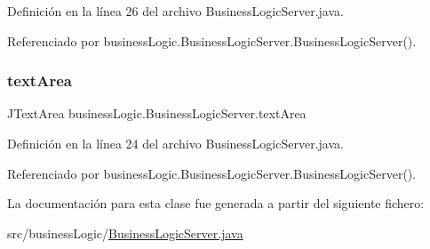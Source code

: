 Definición en la línea 26 del archivo Business\+Logic\+Server.\+java.



Referenciado por business\+Logic.\+Business\+Logic\+Server.\+Business\+Logic\+Server().

\mbox{\label{classbusiness_logic_1_1_business_logic_server_aec137250843e53f480cd28952ca4afd7}} 
\subsubsection{\texorpdfstring{textArea}{textArea}}
{\footnotesize\ttfamily J\+Text\+Area business\+Logic.\+Business\+Logic\+Server.\+text\+Area\hspace{0.3cm}{\ttfamily [package]}}



Definición en la línea 24 del archivo Business\+Logic\+Server.\+java.



Referenciado por business\+Logic.\+Business\+Logic\+Server.\+Business\+Logic\+Server().



La documentación para esta clase fue generada a partir del siguiente fichero\+:\begin{DoxyCompactItemize}
\item 
src/business\+Logic/\mbox{\hyperlink{_business_logic_server_8java}{Business\+Logic\+Server.\+java}}\end{DoxyCompactItemize}
